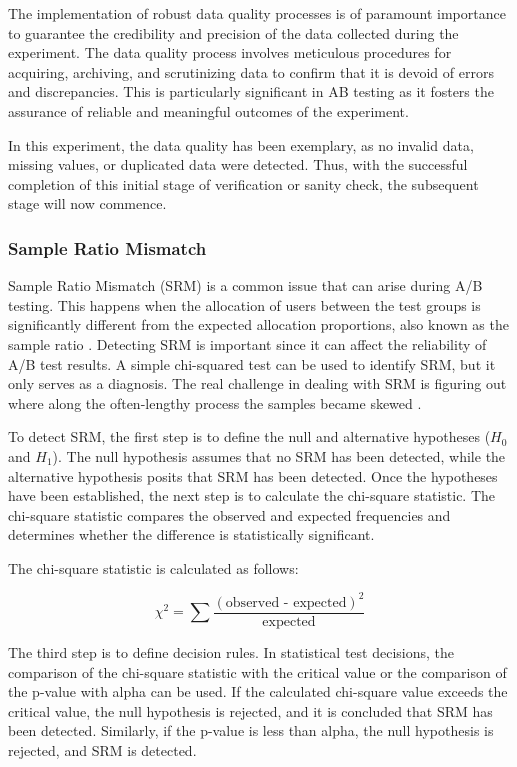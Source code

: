 \documentclass{article}
\begin{document}
The implementation of robust data quality processes is of paramount importance to guarantee the credibility and precision of the data collected during the experiment. The data quality process involves meticulous procedures for acquiring, archiving, and scrutinizing data to confirm that it is devoid of errors and discrepancies. This is particularly significant in AB testing as it fosters the assurance of reliable and meaningful outcomes of the experiment.

In this experiment, the data quality has been exemplary, as no invalid data, missing values, or duplicated data were detected. Thus, with the successful completion of this initial stage of verification or sanity check, the subsequent stage will now commence.  

\subsubsection*{Sample Ratio Mismatch} 

Sample Ratio Mismatch (SRM) is a common issue that can arise during A/B testing. This happens when the allocation of users between the test groups is significantly different from the expected allocation proportions, also known as the sample ratio \cite{healy_2022_sample}. Detecting SRM is important since it can affect the reliability of A/B test results. A simple chi-squared test can be used to identify SRM, but it only serves as a diagnosis. The real challenge in dealing with SRM is figuring out where along the often-lengthy process the samples became skewed \cite{ye_2020_ab}.

To detect SRM, the first step is to define the null and alternative hypotheses ($H_{0}$ and $H_{1}$). The null hypothesis assumes that no SRM has been detected, while the alternative hypothesis posits that SRM has been detected. Once the hypotheses have been established, the next step is to calculate the chi-square statistic. The chi-square statistic compares the observed and expected frequencies and determines whether the difference is statistically significant.

The chi-square statistic is calculated as follows:

$$ \chi^2 = \sum \frac{\left ( \text{observed - expected} \right )^2}{\text{expected}} $$

The third step is to define decision rules. In statistical test decisions, the comparison of the chi-square statistic with the critical value or the comparison of the p-value with alpha can be used. If the calculated chi-square value exceeds the critical value, the null hypothesis is rejected, and it is concluded that SRM has been detected. Similarly, if the p-value is less than alpha, the null hypothesis is rejected, and SRM is detected.
\end{document}
